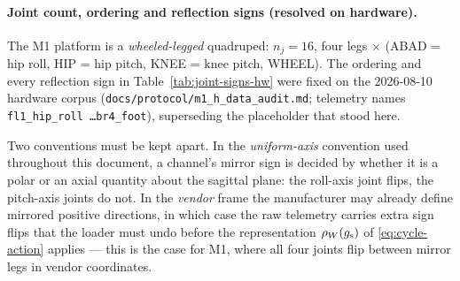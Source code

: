 \paragraph{Joint count, ordering and reflection signs (resolved on hardware).}
The M1 platform is a \emph{wheeled-legged} quadruped: $n_j = 16$, four legs
$\times$ (ABAD = hip roll, HIP = hip pitch, KNEE = knee pitch, WHEEL). The
ordering and every reflection sign in Table~\ref{tab:joint-signs-hw} were fixed on
the 2026-08-10 hardware corpus (\texttt{docs/protocol/m1\_h\_data\_audit.md};
telemetry names \texttt{fl1\_hip\_roll \dots br4\_foot}), superseding the
placeholder that stood here.

Two conventions must be kept apart. In the \emph{uniform-axis} convention used
throughout this document, a channel's mirror sign is decided by whether it is a
polar or an axial quantity about the sagittal plane: the roll-axis joint flips,
the pitch-axis joints do not. In the \emph{vendor} frame the manufacturer may
already define mirrored positive directions, in which case the raw telemetry
carries extra sign flips that the loader must undo before the representation
$\rho_{W}(g_{\mathrm{s}})$ of \eqref{eq:cycle-action} applies --- this is the case for M1,
where all four joints flip between mirror legs in vendor coordinates.

